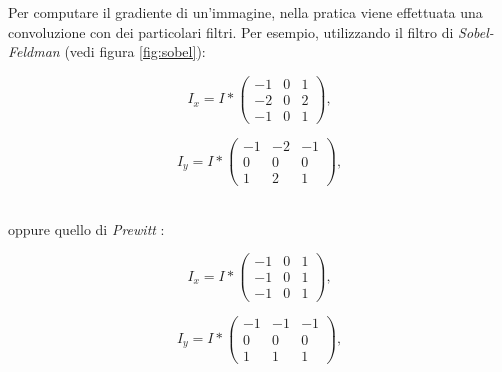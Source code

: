 Per computare il gradiente di un'immagine, nella pratica viene effettuata una convoluzione con dei particolari filtri. Per esempio, utilizzando il filtro di \textit{Sobel-Feldman} (vedi figura \ref{fig:sobel}):\\
\vspace*{15pt}
\hspace*{-8pt}
\noindent\begin{minipage}{.5\linewidth}
	\begin{equation}
		I_{x} = I * 
			\begin{pmatrix}
				-1 & 0 & 1 \\
				-2 & 0 & 2\\
				-1 & 0 & 1
			\end{pmatrix},
		\label{eq:sobel-x}
	\end{equation}
\end{minipage}%
\hspace*{-10pt}
\begin{minipage}{.5\linewidth}
	\begin{equation}
		I_{y} = I * 
			\begin{pmatrix}
				-1 & -2 & -1 \\
				0 & 0 & 0\\
				1 & 2 & 1
			\end{pmatrix},
		\label{eq:sobel-y}
	\end{equation}
\end{minipage}\\
oppure quello di \textit{Prewitt} \cite{bib:prewitt}:\\
\noindent\begin{minipage}{.5\linewidth}
	\begin{equation}
		I_{x} = I * 
			\begin{pmatrix}
				-1 & 0 & 1 \\
				-1 & 0 & 1\\
				-1 & 0 & 1
			\end{pmatrix},
		\label{eq:prewitt-x}
	\end{equation}
\end{minipage}%
\begin{minipage}{.5\linewidth}
	\begin{equation}
		I_{y} = I * 
			\begin{pmatrix}
				-1 & -1 & -1 \\
				0 & 0 & 0\\
				1 & 1 & 1
			\end{pmatrix},
		\label{eq:prewitt-y}
	\end{equation}
\end{minipage}
